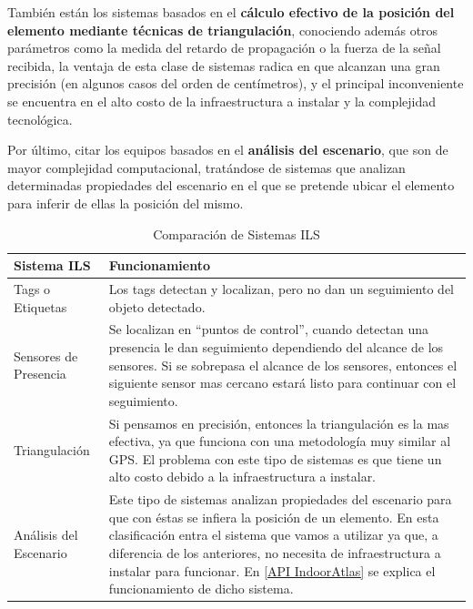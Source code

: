 También están los sistemas basados en el \textbf{cálculo efectivo de la posición del elemento mediante técnicas de triangulación}, conociendo además otros parámetros como la medida del retardo de propagación o la fuerza de la señal recibida, la ventaja de esta clase de sistemas radica en que alcanzan una gran precisión (en algunos casos del orden de centímetros), y el principal inconveniente se encuentra en el alto costo de la infraestructura a instalar y la complejidad tecnológica.

Por último, citar los equipos basados en el \textbf{análisis del escenario}, que son de mayor complejidad computacional, tratándose de sistemas que analizan determinadas propiedades del escenario en el que se pretende ubicar el elemento para inferir de ellas la posición del mismo. \cite{ILS}

\begin{table}[h!]
	\begin{center}
		\begin{tabular}{|p{3.8cm}|p{10.2cm}|}
			\hline \rowcolor[RGB]{51,153,255} 
			\textcolor{blanco}{\bf Sistema ILS} &
				\textcolor{blanco}{\bf Funcionamiento} \\
			\hline 
				Tags o Etiquetas &
				Los tags detectan y localizan, pero no dan un seguimiento del objeto detectado. \\
      		\hline \rowcolor[RGB]{240,248,255}
      			Sensores de Presencia &
				Se localizan en ``puntos de control'', cuando detectan una presencia le dan seguimiento dependiendo del alcance de los sensores. Si se sobrepasa el alcance de los sensores, entonces el siguiente sensor mas cercano estará listo para continuar con el seguimiento. \\
			\hline 
				Triangulación &
				Si pensamos en precisión, entonces la triangulación es la mas efectiva, ya que funciona con una metodología muy similar al GPS. El problema con este tipo de sistemas es que tiene un alto costo debido a la infraestructura a instalar. \\
			\hline \rowcolor[RGB]{240,248,255}
      			Análisis del Escenario &
				Este tipo de sistemas analizan propiedades del escenario para que con éstas se infiera la posición de un elemento. En esta clasificación entra el sistema que vamos a utilizar ya que, a diferencia de los anteriores, no necesita de infraestructura a instalar para funcionar. En \hyperlink{APIIndoorAtlas}{[API IndoorAtlas]} se explica el funcionamiento de dicho sistema. \\ 
      		\hline 
    		\end{tabular}
	\end{center}
	\caption[Comparación de Sistemas ILS]{Comparación de Sistemas ILS} 
	\label{tab:comparacionILS}
\end{table}

